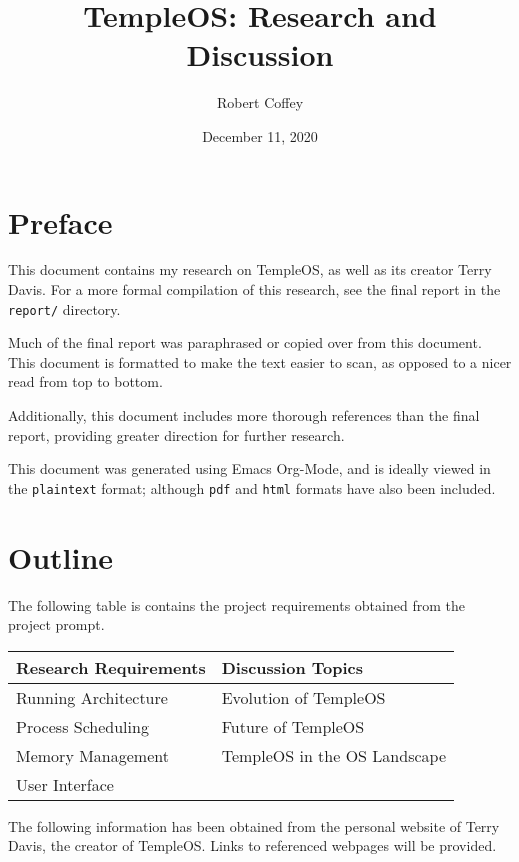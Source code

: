 \documentclass[11pt]{article}
\author{Robert Coffey}
\date{December 11, 2020}
\title{TempleOS: Research and Discussion}
\begin{document}
\maketitle
\tableofcontents

 \newpage
{}

\section{Preface}
\label{sec:org74f8e03}

This document contains my research on TempleOS, as well as its creator Terry
Davis. For a more formal compilation of this research, see the final report in
the \texttt{report/} directory.

Much of the final report was paraphrased or copied over from this document. This
document is formatted to make the text easier to scan, as opposed to a nicer
read from top to bottom.

Additionally, this document includes more thorough references than the final
report, providing greater direction for further research.

This document was generated using Emacs Org-Mode, and is ideally viewed in the
\texttt{plaintext} format; although \texttt{pdf} and \texttt{html} formats have also been included.

\section{Outline}
\label{sec:orgc95e2f3}

The following table is contains the project requirements obtained from the
project prompt.

\begin{center}
\begin{tabular}{ll}
\hline
Research Requirements & Discussion Topics\\
\hline
Running Architecture & Evolution of TempleOS\\
Process Scheduling & Future of TempleOS\\
Memory Management & TempleOS in the OS Landscape\\
User Interface & \\
\hline
\end{tabular}
\end{center}

The following information has been obtained from the personal website of Terry
Davis, the creator of TempleOS. Links to referenced webpages will be provided.
\end{document}

